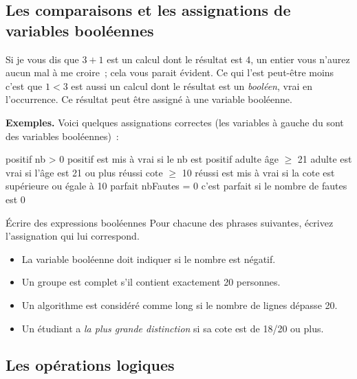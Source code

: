 		\subsection{Les comparaisons et les assignations de variables booléennes}
		
			Si je vous dis que $3+1$ est un calcul
			dont le résultat est $4$, un entier
			vous n’aurez aucun mal à me croire~; 
			cela vous parait évident.
			Ce qui l’est peut-être moins c’est que $1<3$ est aussi
			un calcul dont le résultat est un \emph{booléen},
			vrai en l’occurrence. 
			Ce résultat peut être assigné à une variable booléenne.			

			\textbf{Exemples.}
			Voici quelques assignations correctes 
			(les variables à gauche du \Gets sont des variables booléennes)~:
			\begin{LDA}
				\Let positif \Gets nb > 0 \RComment positif est mis à vrai si le nb est positif 
				\Let adulte \Gets âge $\ge$ 21 \RComment adulte est vrai si l’âge est 21 ou plus
				\Let réussi \Gets cote $\ge$ 10 \RComment réussi est mis à vrai si la cote est supérieure ou égale à 10
				\Let parfait \Gets nbFautes = 0 \RComment c’est parfait si le nombre de fautes est 0
			\end{LDA}
		
			\begin{Exercice}{Écrire des expressions booléennes}
				Pour chacune des phrases suivantes,
				écrivez l’assignation qui lui correspond.
				\begin{itemize}
				\item 
					La variable booléenne 
					doit indiquer si le nombre  est négatif.
				\item
					Un groupe est complet s’il contient exactement 20 personnes.
				\item
					Un algorithme est considéré comme long si le nombre de lignes
					dépasse 20.
				\item 
					Un étudiant a \emph{la plus grande distinction} si sa cote est
					de 18/20 ou plus.
				\end{itemize}
			\end{Exercice}

		\subsection{Les opérations logiques}
	
